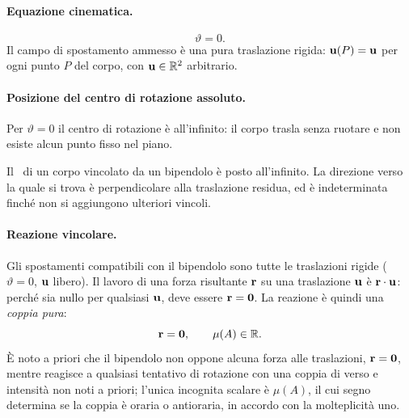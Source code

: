 \paragraph{Equazione cinematica.}
\begin{equation}\label{eq:bipendolo_cin}
	\vartheta = 0.
\end{equation}
Il campo di spostamento ammesso è una pura traslazione rigida:
$\mathbf{u}(P) = \mathbf{u}$ per ogni punto $P$ del corpo, con $\mathbf{u} \in
\mathbb{R}^2$ arbitrario.

\paragraph{Posizione del centro di rotazione assoluto.}
Per $\vartheta = 0$ il centro di rotazione è all'infinito:
il corpo trasla senza ruotare e non esiste alcun punto fisso
nel piano.

\begin{proposizione}
	Il \CRa\ di un corpo vincolato da un bipendolo è posto
	all'infinito. La direzione verso la quale si trova è
	perpendicolare alla traslazione residua, ed è indeterminata
	finché non si aggiungono ulteriori vincoli.
\end{proposizione}






\paragraph{Reazione vincolare.}
Gli spostamenti compatibili con il bipendolo sono tutte le
traslazioni rigide ($\vartheta = 0$, $\mathbf{u}$ libero). Il lavoro
di una forza risultante $\mathbf{r}$ su una traslazione $\mathbf{u}$ è
$\mathbf{r}\cdot\mathbf{u}$: perché sia nullo per qualsiasi $\mathbf{u}$, deve
essere $\mathbf{r} = \mathbf{0}$. La reazione è quindi una \emph{coppia
	pura}:
\begin{equation}\label{eq:reazione_bipendolo}
	\mathbf{r} = \mathbf{0},
	\qquad
	\mu(A) \in \mathbb{R}.
\end{equation}
È noto a priori che il bipendolo non oppone alcuna forza
alle traslazioni, $\mathbf{r} = \mathbf{0}$, mentre reagisce a
qualsiasi tentativo di rotazione con una coppia di verso e
intensità non noti a priori; l'unica incognita scalare è
$\mu(A)$, il cui segno determina se la coppia è oraria o
antioraria, in accordo con la molteplicità uno.


